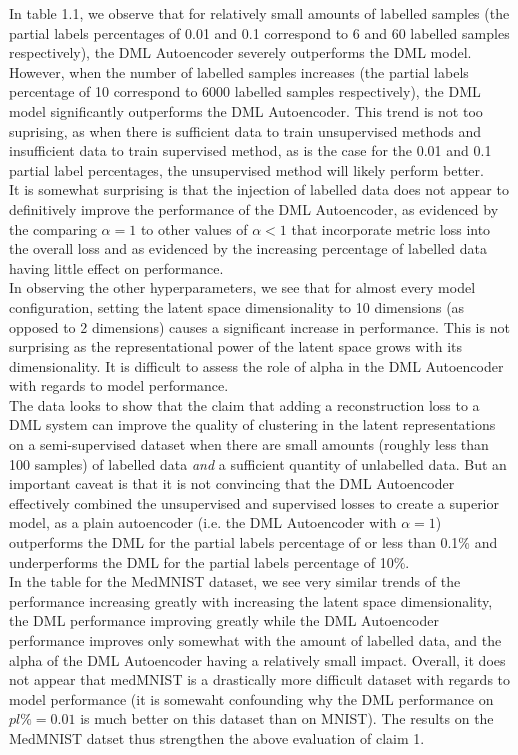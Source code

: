 \documentclass[./dissertation.tex]{subfiles}
\begin{document}
   In table 1.1, we observe that for relatively small amounts of labelled samples (the partial labels percentages of 0.01 and 0.1 correspond to 6 and 60 labelled samples respectively), the DML Autoencoder severely outperforms the DML model. However, when the number of labelled samples increases (the partial labels percentage of 10 correspond to 6000 labelled samples respectively), the DML model significantly outperforms the DML Autoencoder. This trend is not too suprising, as when there is sufficient data to train unsupervised methods and insufficient data to train supervised method, as is the case for the 0.01 and 0.1 partial label percentages, the unsupervised method will likely perform better. \\
   
   It is somewhat surprising is that the injection of labelled data does not appear to definitively improve the performance of the DML Autoencoder, as evidenced by the comparing $\alpha=1$ to other values of $\alpha < 1$ that incorporate metric loss into the overall loss and as evidenced by the increasing percentage of labelled data having little effect on performance. \\ 
   
   In observing the other hyperparameters, we see that for almost every model configuration, setting the latent space dimensionality to 10 dimensions (as opposed to 2 dimensions) causes a significant increase in performance. This is not surprising as the representational power of the latent space grows with its dimensionality. It is difficult to assess the role of alpha in the DML Autoencoder with regards to model performance. \\
   
   The data looks to show that the claim that adding a reconstruction loss to a DML system can improve the quality of clustering in the latent representations on a semi-supervised dataset when there are small amounts (roughly less than 100 samples) of labelled data \textit{and} a sufficient quantity of unlabelled data. But an important caveat is that it is not convincing that the DML Autoencoder effectively combined the unsupervised and supervised losses to create a superior model, as a plain autoencoder (i.e. the DML Autoencoder with $\alpha = 1$) outperforms the DML for the partial labels percentage of or less than 0.1\% and underperforms the DML for the partial labels percentage of 10\%. \\
   
   In the table for the MedMNIST dataset, we see very similar trends of the performance increasing greatly with increasing the latent space dimensionality, the DML performance improving greatly while the DML Autoencoder performance improves only somewhat with the amount of labelled data, and the alpha of the DML Autoencoder having a relatively small impact. Overall, it does not appear that medMNIST is a drastically more difficult dataset with regards to model performance (it is somewaht confounding why the DML performance on $pl\% = 0.01$ is much better on this dataset than on MNIST). The results on the MedMNIST datset thus strengthen the above evaluation of claim 1.
   
\end{document}
